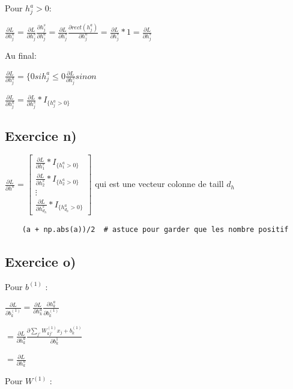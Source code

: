 \documentclass[a4paper,10pt]{article}
\begin{document}
Pour $h^a_j > 0$:

$\frac{\partial L}{\partial h^a_j} = \frac{\partial L}{\partial h^s_j} \frac{\partial h^s_j}{\partial h^a_j} = \frac{\partial L}{\partial h^s_j} \frac{\partial rect(h^a_j)}{\partial h^a_j} = \frac{\partial L}{\partial h^s_j}*1 = \frac{\partial L}{\partial h^s_j}$

Au final:

$\frac{\partial L}{\partial h^a_j} = \lbrace 0 si h^a_j \leq 0 \frac{\partial L}{\partial h^s_j} sinon$

$\frac{\partial L}{\partial h^a_j} = \frac{\partial L}{\partial h^s_j} * I_{\lbrace h^a_j > 0 \rbrace} $

\subsection{Exercice n)}

$\frac{\partial L}{\partial h^a} = \begin{bmatrix}
		\frac{\partial L}{\partial h^s_1} * I_{\lbrace h^a_1 > 0 \rbrace} \\
		\frac{\partial L}{\partial h^s_2} * I_{\lbrace h^a_2 > 0 \rbrace}\\
		\vdots \\
		\frac{\partial L}{\partial h^s_{d_h}}* I_{\lbrace h^a_{d_h} > 0 \rbrace}
		\end{bmatrix}$ qui est une vecteur colonne de taill $d_h$



\begin{verbatim}
	(a + np.abs(a))/2  # astuce pour garder que les nombre positif
\end{verbatim}


\subsection{Exercice o)}

Pour $b^{(1)}$ :

$\frac{\partial L}{\partial b^{(1)}_{k}} = \frac{\partial L}{\partial h^{a}_{k}} \frac{\partial h^{a}_{k}}{\partial b^{(1)}_{k}}$

$ = \frac{\partial L}{\partial h^{a}_{k}} \frac{\partial \sum_{j'} W^{(1)}_{kj'} x_{j} + b^{(1)}_{k}}{\partial b^{1}_{k}}$

$ = \frac{\partial L}{\partial h^{a}_{k}}$

Pour $W^{(1)}$ :
\end{document}
